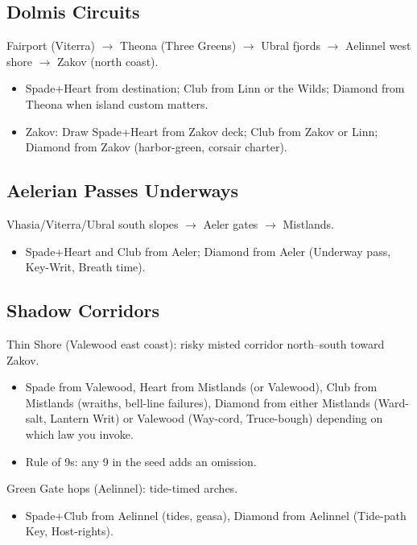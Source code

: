 \documentclass[11pt,letterpaper,twoside]{book}
\begin{document}
\subsection{Dolmis Circuits}
Fairport (Viterra) $\rightarrow$ Theona (Three Greens) $\rightarrow$ Ubral fjords $\rightarrow$ Aelinnel west shore $\rightarrow$ Zakov (north coast).

\begin{itemize}
\item Spade+Heart from destination; Club from Linn or the Wilds; Diamond from Theona when island custom matters.
\item Zakov: Draw Spade+Heart from Zakov deck; Club from Zakov or Linn; Diamond from Zakov (harbor-green, corsair charter).
\end{itemize}

\subsection{Aelerian Passes Underways}
Vhasia/Viterra/Ubral south slopes $\rightarrow$ Aeler gates $\rightarrow$ Mistlands.

\begin{itemize}
\item Spade+Heart and Club from Aeler; Diamond from Aeler (Underway pass, Key-Writ, Breath time).
\end{itemize}

\subsection{Shadow Corridors}
Thin Shore (Valewood east coast): risky misted corridor north--south toward Zakov.

\begin{itemize}
\item Spade from Valewood, Heart from Mistlands (or Valewood), Club from Mistlands (wraiths, bell-line failures), Diamond from either Mistlands (Ward-salt, Lantern Writ) or Valewood (Way-cord, Truce-bough) depending on which law you invoke.
\item Rule of 9s: any 9 in the seed adds an omission.
\end{itemize}

Green Gate hops (Aelinnel): tide-timed arches.

\begin{itemize}
\item Spade+Club from Aelinnel (tides, geasa), Diamond from Aelinnel (Tide-path Key, Host-rights).
\end{itemize}
\end{document}
